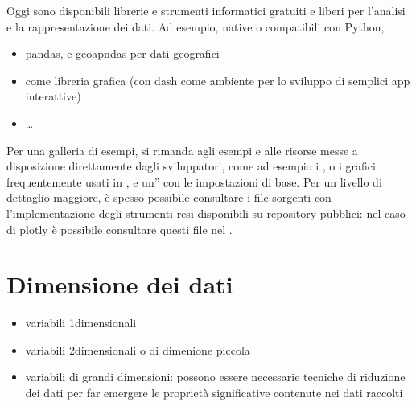 \documentclass[letterpaper,10pt,italian]{jupyterBook}
\begin{document}
\sphinxAtStartPar
Oggi sono disponibili librerie e strumenti informatici gratuiti e liberi per l’analisi e la rappresentazione dei dati. Ad esempio, native o compatibili con Python,
\begin{itemize}
\item {} 
\sphinxAtStartPar
pandas, e geoapndas per dati geografici

\item {} 
\sphinxAtStartPar
{} come libreria grafica (con dash come ambiente per lo sviluppo di semplici app interattive)

\item {} 
\sphinxAtStartPar
…

\end{itemize}

\sphinxAtStartPar
Per una galleria di esempi, si rimanda agli esempi e alle risorse messe a disposizione direttamente dagli sviluppatori, come ad esempio i , o i grafici frequentemente usati in , e un” con le impostazioni di base. Per un livello di dettaglio maggiore, è spesso possibile consultare i file sorgenti con l’implementazione degli strumenti resi disponibili su repository pubblici: nel caso di plotly è possibile consultare questi file nel .


\section{Dimensione dei dati}
\label{\detokenize{ch/statistics/descriptive:dimensione-dei-dati}}\begin{itemize}
\item {} 
\sphinxAtStartPar
variabili 1\sphinxhyphen{}dimensionali

\item {} 
\sphinxAtStartPar
variabili 2\sphinxhyphen{}dimensionali o di dimenione piccola

\item {} 
\sphinxAtStartPar
variabili di grandi dimensioni: possono essere necessarie tecniche di riduzione dei dati per far emergere le proprietà significative contenute nei dati raccolti

\end{itemize}
\end{document}
